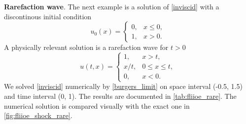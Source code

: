 \documentclass[../include.tex]{subfiles}
\begin{document}
\textbf{Rarefaction wave}. The next example is a solution of \eqref{inviscid} with a discontinous initial condition
\begin{equation}
	u_0(x) =
	\begin{cases}
		0, &x\leq 0,\nonumber\\
		1, &x>0.\nonumber
	\end{cases}
\end{equation}
A physically relevant solution is a rarefaction wave\cite{olv, lev, whitham} for $ t>0 $
\begin{equation}
	u(t,x) =
	\begin{cases}
		1, &x>t,\nonumber\\
		x/t, &0 \leq x \leq t,\nonumber\\
		0, &x<0.\nonumber
	\end{cases}
\end{equation}
We solved \eqref{inviscid} numerically by \eqref{burgers_limit} on space interval (-0.5, 1.5) and time interval (0, 1). The results are documented in \ref{tab:fliioe_rare}. The numerical solution is compared visually with the exact one in \ref{fig:fliioe_shock_rare}.
\end{document}
